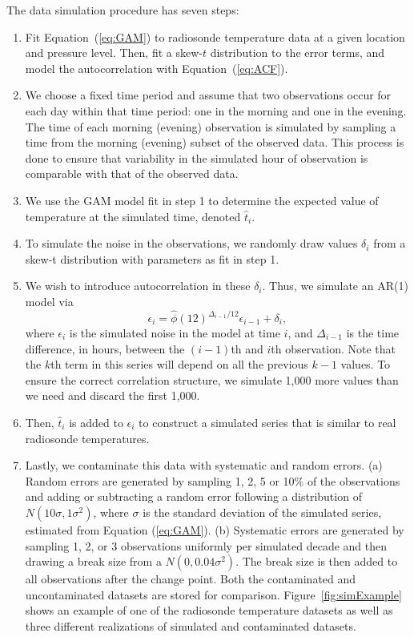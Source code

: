 \documentclass[12pt]{article}
\begin{document}
\begin{doublespacing}
The data simulation procedure has seven steps:
\begin{enumerate}
	\item Fit Equation~(\ref{eq:GAM}) to radiosonde temperature data at a given location and pressure level.  Then, fit a skew-$t$ distribution to the error terms, and model the autocorrelation with Equation~(\ref{eq:ACF}).
	\item We choose a fixed time period and assume that two observations occur for each day within that time period: one in the morning and one in the evening.  The time of each morning (evening) observation is simulated by sampling a time from the morning (evening) subset of the observed data.  This process is done to ensure that variability in the simulated hour of observation is comparable with that of the observed data.
	\item We use the GAM model fit in step 1 to determine the expected value of temperature at the simulated time, denoted $\hat t_i$.
	\item To simulate the noise in the observations, we randomly draw values $\delta_i$ from a skew-t distribution with parameters as fit in step 1.
	\item We wish to introduce autocorrelation in these $\delta_i$.  Thus, we simulate an AR(1) model via
	\begin{equation*}
	\epsilon_i = \widehat{\phi}(12)^{\Delta_{i-1}/12} \epsilon_{i-1} + \delta_i,
	\end{equation*}
	where $\epsilon_i$ is the simulated noise in the model at time $i$, and $\Delta_{i-1}$ is the time difference, in hours, between the $(i-1)$th and $i$th observation.  Note that the $k$th term in this series will depend on all the previous $k-1$ values.  To ensure the correct correlation structure, we simulate 1,000 more values than we need and discard the first 1,000.
	\item Then, $\hat{t}_i$ is added to $\epsilon_i$ to construct a simulated series that is similar to real radiosonde temperatures.

	\item Lastly, we contaminate this data with systematic and random errors.  (a) Random errors are generated by sampling 1, 2, 5 or 10\% of the observations and adding or subtracting a random error following a distribution of $N(10\sigma,1\sigma^2)$, where $\sigma$ is the standard deviation of the simulated series, estimated from Equation (\ref{eq:GAM}).  (b) Systematic errors are generated by sampling 1, 2, or 3 observations uniformly per simulated decade and then drawing a break size from a $N(0,0.04 \sigma^2)$.  The break size is then added to all observations after the change point.  Both the contaminated and uncontaminated datasets are stored for comparison.  Figure~\ref{fig:simExample} shows an example of one of the radiosonde temperature datasets as well as three different realizations of simulated and contaminated datasets.
\end{enumerate}


\end{doublespacing}
\end{document}
